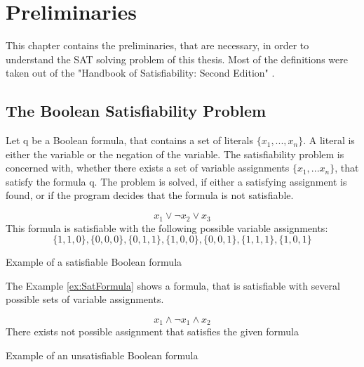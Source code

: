
\chapter{Preliminaries}
\label{ch:Preliminaries}

This chapter contains the preliminaries, that are necessary, in order to understand the SAT solving problem of this thesis. Most of the definitions were taken out of the "Handbook of Satisfiability: Second Edition" \cite{biere2009handbook}.

\section{The Boolean Satisfiability Problem}
Let q be a Boolean formula, that contains a set of literals $\{x_1,...,x_n\}$. A literal is either the variable or the negation of the variable. The satisfiability problem is concerned with, whether there exists a set of variable assignments $\{x_1,...x_n\}$, that satisfy the formula q. The problem is solved, if either a satisfying assignment is found, or if the program decides that the formula is not satisfiable. \cite{biere2009handbook}

\begin{example}
\begin{leftbar}
\begin{displaymath}
x_1 \vee \neg x_2 \vee x_3
\end{displaymath}
This formula is satisfiable with the following possible variable assignments:
\begin{displaymath}
\{1,1,0\},\{0,0,0\},\{0,1,1\},\{1,0,0\},\{0,0,1\},\{1,1,1\},\{1,0,1\}
\end{displaymath}
\end{leftbar}
\caption{Example of a satisfiable Boolean formula}
\label{ex:SatFormula}
\end{example}

The Example \ref{ex:SatFormula} shows a formula, that is satisfiable with several possible sets of variable assignments.

\begin{example}
\begin{leftbar}
\begin{displaymath}
x_1 \wedge \neg x_1 \wedge x_2
\end{displaymath}
There exists not possible assignment that satisfies the given formula
\end{leftbar}
\caption{Example of an unsatisfiable Boolean formula}
\label{ex:UnsatFormula}
\end{example}


